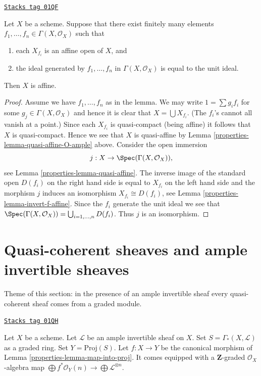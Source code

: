 \begin{lemma}
\label{properties-lemma-characterize-affine}
\href{https://stacks.math.columbia.edu/tag/01QF}{\texttt{Stacks tag 01QF}}

Let $X$ be a scheme. Suppose that there exist finitely many elements
$f_1, \ldots, f_n \in \Gamma(X, \mathcal{O}_X)$ such that
\begin{enumerate}
\item each $X_{f_i}$ is an affine open of $X$, and
\item the ideal generated by $f_1, \ldots, f_n$ in
$\Gamma(X, \mathcal{O}_X)$ is equal to the unit ideal.
\end{enumerate}
Then $X$ is affine.
\end{lemma}

\begin{proof}

Assume we have $f_1, \ldots, f_n$ as in the lemma.
We may write $1 = \sum g_i f_i$ for some $g_j \in \Gamma(X, \mathcal{O}_X)$
and hence it is clear that $X = \bigcup X_{f_i}$. (The $f_i$'s cannot
all vanish at a point.) Since each $X_{f_i}$
is quasi-compact (being affine) it follows that $X$ is quasi-compact.
Hence we see that $X$ is quasi-affine by
Lemma \ref{properties-lemma-quasi-affine-O-ample} above.
Consider the open immersion
$$
j : X \to \Spec(\Gamma(X, \mathcal{O}_X)),
$$
see Lemma \ref{properties-lemma-quasi-affine}. The inverse image of the standard open
$D(f_i)$ on the right hand side is equal to $X_{f_i}$ on the
left hand side and the morphism $j$ induces an isomorphism
$X_{f_i} \cong D(f_i)$, see
Lemma \ref{properties-lemma-invert-f-affine}. Since the $f_i$ generate the unit ideal
we see that $\Spec(\Gamma(X, \mathcal{O}_X))
= \bigcup_{i = 1, \ldots, n} D(f_i)$. Thus $j$ is an isomorphism.
\end{proof}

\section{Quasi-coherent sheaves and ample invertible sheaves}
\label{properties-section-ample-quasi-coherent}
Theme of this section: in the presence of an ample invertible sheaf
every quasi-coherent sheaf comes from a graded module.

\begin{definition}
\label{properties-situation-ample}
\href{https://stacks.math.columbia.edu/tag/01QH}{\texttt{Stacks tag 01QH}}

Let $X$ be a scheme.
Let $\mathcal{L}$ be an ample invertible sheaf on $X$.
Set $S = \Gamma_*(X, \mathcal{L})$ as a graded ring.
Set $Y = \text{Proj}(S)$.
Let $f : X \to Y$ be the canonical morphism of Lemma \ref{properties-lemma-map-into-proj}.
It comes equipped with a $\mathbf{Z}$-graded $\mathcal{O}_X$-algebra map
$\bigoplus f^*\mathcal{O}_Y(n) \to \bigoplus \mathcal{L}^{\otimes n}$.
\end{definition}

